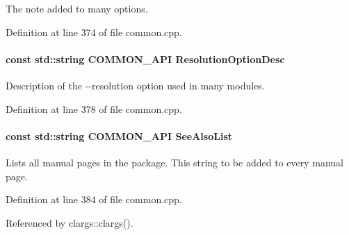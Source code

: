 The note added to many options. 



Definition at line 374 of file common.cpp.

\hypertarget{group__CommonFunctions_gab3b95945319d230e7acf62cff169017c}{
\paragraph[{ResolutionOptionDesc}]{\setlength{\rightskip}{0pt plus 5cm}const std::string COMMON\_\-API {\bf ResolutionOptionDesc}}\hfill}
\label{group__CommonFunctions_gab3b95945319d230e7acf62cff169017c}


Description of the -\/-\/resolution option used in many modules. 



Definition at line 378 of file common.cpp.

\hypertarget{group__CommonFunctions_gaf35a6e67bb37a3f948d1f01bc7a0c80b}{
\paragraph[{SeeAlsoList}]{\setlength{\rightskip}{0pt plus 5cm}const std::string COMMON\_\-API {\bf SeeAlsoList}}\hfill}
\label{group__CommonFunctions_gaf35a6e67bb37a3f948d1f01bc7a0c80b}
Lists all manual pages in the package. This string to be added to every manual page. 

Definition at line 384 of file common.cpp.



Referenced by clargs::clargs().


